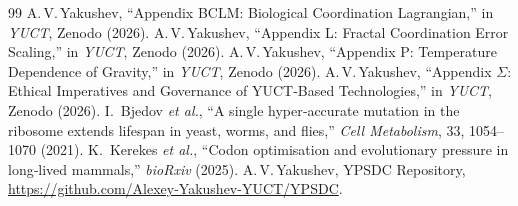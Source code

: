 \documentclass[12pt,a4paper]{ltjsarticle}
\begin{document}
	\begin{thebibliography}{99}
		 A.\,V.\,Yakushev, ``Appendix BCLM: Biological Coordination Lagrangian,'' in \emph{YUCT}, Zenodo (2026).
		 A.\,V.\,Yakushev, ``Appendix L: Fractal Coordination Error Scaling,'' in \emph{YUCT}, Zenodo (2026).
		 A.\,V.\,Yakushev, ``Appendix P: Temperature Dependence of Gravity,'' in \emph{YUCT}, Zenodo (2026).
		 A.\,V.\,Yakushev, ``Appendix \(\Sigma\): Ethical Imperatives and Governance of YUCT‑Based Technologies,'' in \emph{YUCT}, Zenodo (2026).
		 I.~Bjedov \emph{et al.}, ``A single hyper‑accurate mutation in the ribosome extends lifespan in yeast, worms, and flies,'' \emph{Cell Metabolism}, 33, 1054–1070 (2021).
		 K.~Kerekes \emph{et al.}, ``Codon optimisation and evolutionary pressure in long‑lived mammals,'' \emph{bioRxiv} (2025).
		 A.\,V.\,Yakushev, YPSDC Repository, \url{https://github.com/Alexey-Yakushev-YUCT/YPSDC}.
	\end{thebibliography}
	
\end{document}
